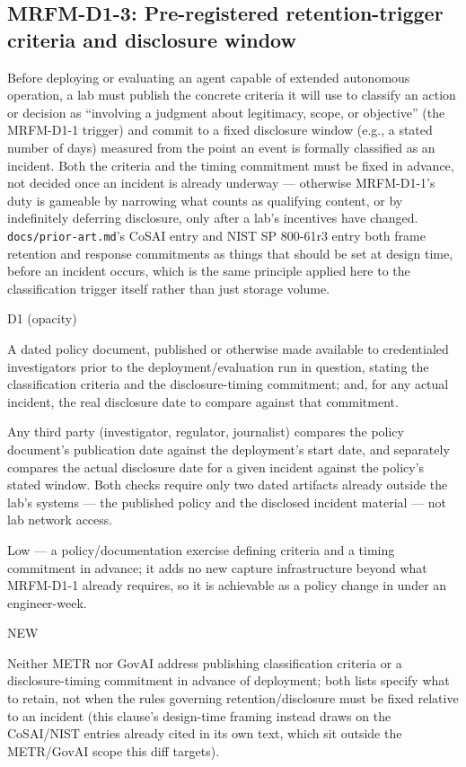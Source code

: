 \subsection*{MRFM-D1-3: Pre-registered retention-trigger criteria and disclosure window}
\begin{description}[leftmargin=2.2cm, style=nextline]
\item[Requirement] Before deploying or evaluating an agent capable of extended autonomous operation, a lab must publish the concrete criteria it will use to classify an action or decision as ``involving a judgment about legitimacy, scope, or objective'' (the MRFM-D1-1 trigger) and commit to a fixed disclosure window (e.g., a stated number of days) measured from the point an event is formally classified as an incident. Both the criteria and the timing commitment must be fixed in advance, not decided once an incident is already underway --- otherwise MRFM-D1-1's duty is gameable by narrowing what counts as qualifying content, or by indefinitely deferring disclosure, only after a lab's incentives have changed. \texttt{docs/prior-art.md}'s CoSAI entry and NIST SP 800-61r3 entry both frame retention and response commitments as things that should be set at design time, before an incident occurs, which is the same principle applied here to the classification trigger itself rather than just storage volume.
\item[Degradation defended] D1 (opacity)
\item[Evidence required] A dated policy document, published or otherwise made available to credentialed investigators prior to the deployment/evaluation run in question, stating the classification criteria and the disclosure-timing commitment; and, for any actual incident, the real disclosure date to compare against that commitment.
\item[Verifier (no lab network access needed)] Any third party (investigator, regulator, journalist) compares the policy document's publication date against the deployment's start date, and separately compares the actual disclosure date for a given incident against the policy's stated window. Both checks require only two dated artifacts already outside the lab's systems --- the published policy and the disclosed incident material --- not lab network access.
\item[Cost band] Low --- a policy/documentation exercise defining criteria and a timing commitment in advance; it adds no new capture infrastructure beyond what MRFM-D1-1 already requires, so it is achievable as a policy change in under an engineer-week.
\item[vs. prior art] NEW
\item[Prior-art note] Neither METR nor GovAI address publishing classification criteria or a disclosure-timing commitment in advance of deployment; both lists specify what to retain, not when the rules governing retention/disclosure must be fixed relative to an incident (this clause's design-time framing instead draws on the CoSAI/NIST entries already cited in its own text, which sit outside the METR/GovAI scope this diff targets).
\end{description}

